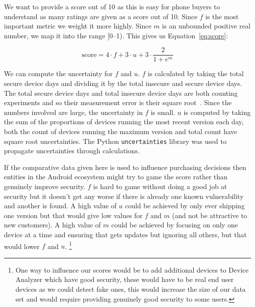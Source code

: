 We want to provide a score out of 10 as this is easy for phone buyers to understand as many ratings are given as a score out of 10.
Since $f$ is the most important metric we weight it more highly.
Since $m$ is an unbounded positive real number, we map it into the range [0--1).
This gives us Equation~\ref{eq:score}:

\begin{equation}
\mathrm{score} = 4 \cdot f + 3 \cdot u + 3 \cdot \frac{2}{1+e^m} \label{eq:score}
\end{equation}

We can compute the uncertainty for $f$ and $u$.
$f$ is calculated by taking the total secure device days and dividing it by the total insecure and secure device days.
The total secure device days and total insecure device days are both counting experiments and so their measurement error is their square root~\cite{Taylor1997}.
Since the numbers involved are large, the uncertainty in $f$ is small.
$u$ is computed by taking the sum of the proportions of devices running the most recent version each day, both the count of devices running the maximum version and total count have square root uncertainties.
The Python \texttt{uncertainties} library was used to propagate uncertainties through calculations.


If the comparative data given here is used to influence purchasing decisions then entities in the Android ecosystem might try to game the score rather than genuinely improve security.
$f$ is hard to game without doing a good job at security but it doesn't get any worse if there is already one known vulnerability and another is found.
A high value of $u$ could be achieved by only ever shipping one version but that would give low values for $f$ and $m$ (and not be attractive to new customers).
A high value of $m$ could be achieved by focusing on only one device at a time and ensuring that gets updates but ignoring all others, but that would lower $f$ and $u$.
\footnote{One way to influence our scores would be to add additional devices to Device Analyzer which have good security, these would have to be real end user devices as we could detect fake ones, this would increase the size of our data set and would require providing genuinely good security to some users.}

